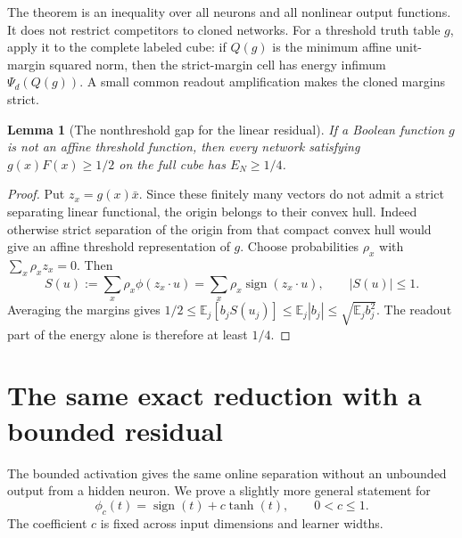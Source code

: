\documentclass[11pt]{article}
\newtheorem{lemma}[theorem]{Lemma}
\newcommand{\E}{\mathbb E}
\newcommand{\sgn}{\operatorname{sign}}
\begin{document}
The theorem is an inequality over all neurons and all nonlinear output
functions. It does not restrict competitors to cloned networks.
For a threshold truth table $g$, apply it to the complete labeled cube:
if $Q(g)$ is the minimum affine unit-margin squared norm, then the
strict-margin cell has energy infimum $\Psi_d(Q(g))$.
A small common readout amplification makes the cloned margins strict.

\begin{lemma}[The nonthreshold gap for the linear residual]
\label{lem:nonthreshold}
If a Boolean function $g$ is not an affine threshold function, then every
network satisfying $g(x)F(x)\ge1/2$ on the full cube has $E_N\ge1/4$.
\end{lemma}
\begin{proof}
Put $z_x=g(x)\bar x$. Since these finitely many vectors do not admit a
strict separating linear functional, the origin belongs to their convex
hull. Indeed otherwise strict separation of the origin from that compact
convex hull would give an affine threshold representation of $g$.
Choose probabilities $\rho_x$ with $\sum_x\rho_x z_x=0$. Then
\[
 S(u):=\sum_x\rho_x\phi(z_x\cdot u)
      =\sum_x\rho_x\sgn(z_x\cdot u),\qquad |S(u)|\le1.
\]
Averaging the margins gives
$1/2\le\E_j[b_jS(u_j)]\le\E_j|b_j|\le\sqrt{\E_jb_j^2}$.
The readout part of the energy alone is therefore at least $1/4$.
\end{proof}

\section{The same exact reduction with a bounded residual}

The bounded activation gives the same online separation without an
unbounded output from a hidden neuron. We prove a slightly more general
statement for
\[
 \phi_c(t)=\sgn(t)+c\tanh(t),\qquad 0<c\le1.
\]
The coefficient $c$ is fixed across input dimensions and learner widths.
\end{document}
